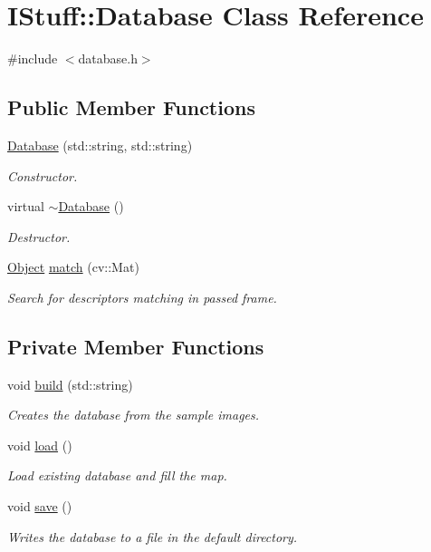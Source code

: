\hypertarget{class_i_stuff_1_1_database}{\section{I\-Stuff\-:\-:Database Class Reference}
\label{class_i_stuff_1_1_database}
}


{\ttfamily \#include $<$database.\-h$>$}

\subsection*{Public Member Functions}
\begin{DoxyCompactItemize}
\item 
\hyperlink{class_i_stuff_1_1_database_ab569353f3a7991f6eb8345a2d9d61d6b}{Database} (std\-::string, std\-::string)
\begin{DoxyCompactList}\small\item\em Constructor. \end{DoxyCompactList}\item 
virtual \hyperlink{class_i_stuff_1_1_database_a84d399a2ad58d69daab9b05330e1316d}{$\sim$\-Database} ()
\begin{DoxyCompactList}\small\item\em Destructor. \end{DoxyCompactList}\item 
\hyperlink{class_i_stuff_1_1_object}{Object} \hyperlink{class_i_stuff_1_1_database_afc2ff4e18f1b9477722889ee06a765db}{match} (cv\-::\-Mat)
\begin{DoxyCompactList}\small\item\em Search for descriptors matching in passed frame. \end{DoxyCompactList}\end{DoxyCompactItemize}
\subsection*{Private Member Functions}
\begin{DoxyCompactItemize}
\item 
void \hyperlink{class_i_stuff_1_1_database_aed93b2b7c426f730488f66d0909b1212}{build} (std\-::string)
\begin{DoxyCompactList}\small\item\em Creates the database from the sample images. \end{DoxyCompactList}\item 
void \hyperlink{class_i_stuff_1_1_database_a0d09456daeb72a2a2fb432650e55025f}{load} ()
\begin{DoxyCompactList}\small\item\em Load existing database and fill the map. \end{DoxyCompactList}\item 
void \hyperlink{class_i_stuff_1_1_database_a3aae61eb0bc2fa65398f809cc5aa1065}{save} ()
\begin{DoxyCompactList}\small\item\em Writes the database to a file in the default directory. \end{DoxyCompactList}\end{DoxyCompactItemize}
